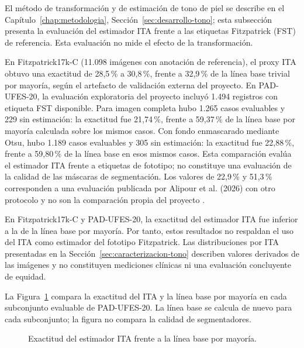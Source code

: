 El método de transformación y de estimación de tono de piel se describe en el Capítulo~\ref{chap:metodologia}, Sección~\ref{sec:desarrollo-tono}; esta subsección presenta la evaluación del estimador ITA frente a las etiquetas Fitzpatrick (FST) de referencia. Esta evaluación no mide el efecto de la transformación.

En Fitzpatrick17k-C (11.098 imágenes con anotación de referencia), el proxy ITA obtuvo una exactitud de 28,5\,\% a 30,8\,\%, frente a 32,9\,\% de la línea base trivial por mayoría, según el artefacto de validación externa del proyecto. En PAD-UFES-20, la evaluación exploratoria del proyecto incluyó 1.494 registros con etiqueta FST disponible. Para imagen completa hubo 1.265 casos evaluables y 229 sin estimación: la exactitud fue 21,74\,\%, frente a 59,37\,\% de la línea base por mayoría calculada sobre los mismos casos. Con fondo enmascarado mediante Otsu, hubo 1.189 casos evaluables y 305 sin estimación: la exactitud fue 22,88\,\%, frente a 59,80\,\% de la línea base en esos mismos casos. Esta comparación evalúa el estimador ITA frente a etiquetas de fototipo; no constituye una evaluación de la calidad de las máscaras de segmentación. Los valores de 22,9\,\% y 51,3\,\% corresponden a una evaluación publicada por Alipour et al. (2026) con otro protocolo y no son la comparación propia del proyecto \parencite{alipour2026italimitations}.

En Fitzpatrick17k-C y PAD-UFES-20, la exactitud del estimador ITA fue inferior a la de la línea base por mayoría. Por tanto, estos resultados no respaldan el uso del ITA como estimador del fototipo Fitzpatrick. Las distribuciones por ITA presentadas en la Sección~\ref{sec:caracterizacion-tono} describen valores derivados de las imágenes y no constituyen mediciones clínicas ni una evaluación concluyente de equidad.

La Figura~\ref{fig:ita-exactitud-pad} compara la exactitud del ITA y la línea base por mayoría en cada subconjunto evaluable de PAD-UFES-20. La línea base se calcula de nuevo para cada subconjunto; la figura no compara la calidad de segmentadores.

\begin{figure}[!htbp]
\caption{Exactitud del estimador ITA frente a la línea base por mayoría.}
\label{fig:ita-exactitud-pad}
\centering
\noindent\makebox[\linewidth][c]{}
\par\smallskip
\raggedright\fontsize{11}{13}\selectfont\singlespacing
\par{}
\end{figure}



